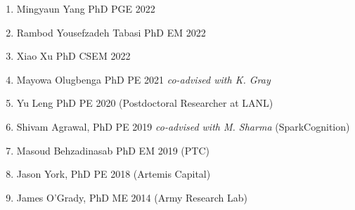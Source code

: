 \else
\begin{enumerate}
    \item Mingyaun Yang PhD PGE 2022
    \item Rambod Yousefzadeh Tabasi PhD EM 2022
    \item Xiao Xu PhD CSEM 2022
    \item Mayowa Olugbenga PhD PE 2021 \emph{co-advised with K. Gray} 
    \item Yu Leng PhD PE 2020 (Postdoctoral Researcher at LANL)
    \item Shivam Agrawal, PhD PE 2019 \emph{co-advised with M. Sharma} (SparkCognition)
    \item Masoud Behzadinasab PhD EM 2019 (PTC)
    \item Jason York, PhD PE 2018 (Artemis Capital) 
    \item James O'Grady, PhD ME 2014 (Army Research Lab)
\end{enumerate}
\fi

